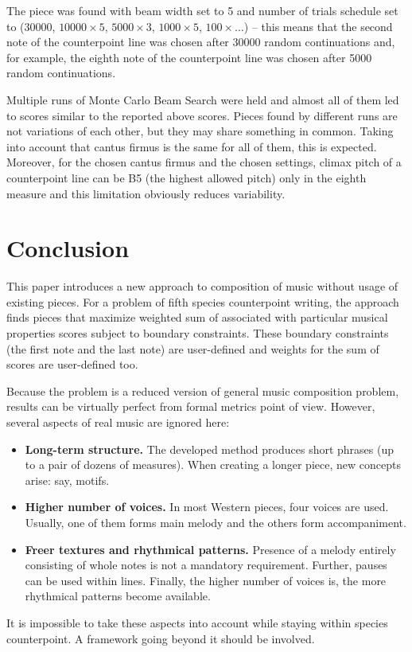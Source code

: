 \documentclass{article}
\begin{document}
The piece was found with beam width set to 5 and number of trials schedule set to ($30000$, $10000 \times 5$, $5000 \times 3$, $1000 \times 5$, $100 \times \dots$) -- this means that the second note of the counterpoint line was chosen after 30000 random continuations and, for example, the eighth note of the counterpoint line was chosen after 5000 random continuations.

Multiple runs of Monte Carlo Beam Search were held and almost all of them led to scores similar to the reported above scores. Pieces found by different runs are not variations of each other, but they may share something in common. Taking into account that cantus firmus is the same for all of them, this is expected. Moreover, for the chosen cantus firmus and the chosen settings, climax pitch of a counterpoint line can be B5 (the highest allowed pitch) only in the eighth measure and this limitation obviously reduces variability. 


\section{Conclusion}
\label{sec:conclusion}

This paper introduces a new approach to composition of music without usage of existing pieces. For a problem of fifth species counterpoint writing, the approach finds pieces that maximize weighted sum of associated with particular musical properties scores subject to boundary constraints. These boundary constraints (the first note and the last note) are user-defined and weights for the sum of scores are user-defined too.

Because the problem is a reduced version of general music composition problem, results can be virtually perfect from formal metrics point of view. However, several aspects of real music are ignored here:
\begin{itemize}
	\item \textbf{Long-term structure.} The developed method produces short phrases (up to a pair of dozens of measures). When creating a longer piece, new concepts arise: say, motifs.
	\item \textbf{Higher number of voices.} In most Western pieces, four voices are used. Usually, one of them forms main melody and the others form accompaniment.
	\item \textbf{Freer textures and rhythmical patterns.} Presence of a melody entirely consisting of whole notes is not a mandatory requirement. Further, pauses can be used within lines. Finally, the higher number of voices is, the more rhythmical patterns become available.
\end{itemize}

It is impossible to take these aspects into account while staying within species counterpoint. A framework going beyond it should be involved.


  

\end{document}
